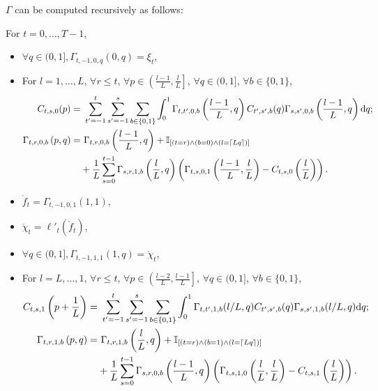 \documentclass{article}
\theoremstyle{plain}
\theoremstyle{definition}
\begin{document}
\begin{lemma}\label{lemma:finite_depth_gamma_formal}
$\Gamma$ can be computed recursively as follows:

For $t=0, \ldots, T-1$,
\begin{itemize}
    \item $\forall q\in (0, 1], \Gamma_{t,-1,0,q}(0,q)  = \xi_t$,
    \item For $l=1,\ldots,L$, 
    $\forall r \leq t$, 
    $\forall p \in \left(\frac{l-1}L,\frac lL\right]$,
    $\forall q\in (0,1]$, $\forall b\in \{0, 1\}$,
    \begin{align*} 
     C_{t,s,0}(p)=&~\sum_{t'=-1}^{t}\sum_{s'=-1}^{s}\sum_{b\in\{0,1\}}\int_0^1 \Gamma_{t,t',0,b}\left(\frac{l-1}L,q\right) C_{t',s',b}(q)\Gamma_{s,s',0,b}\left(\frac{l-1}L,q\right) \mathrm{d} q;\\
     \Gamma_{t,r,0,b}\left(p, q\right) = &~\Gamma_{t,r,0,b}\left(\frac{l-1}L, q\right) + \mathbb{I}_{[(t=r) \wedge (b=0) \wedge (l=\lceil L q\rceil)]} \\
     & + \frac1L \sum_{s=0}^{t-1} \Gamma_{s,r,1,b}\left(\frac l L, q\right)\left(\Gamma_{t,s,0,1}\left(\frac{l-1}L, \frac l L\right)-C_{t,s,0}\left(\frac l L\right)\right).
    \end{align*}
    \item $\mathring f_t = \Gamma_{t,-1,0,1}(1, 1)$,
    \item $\mathring \chi_t = \ell'_t(\mathring f_t)$,
    \item $\forall q\in (0, 1], \Gamma_{t, -1, 1, 1}(1, q)=\mathring \chi_t$,
    \item For $l=L,\ldots,1$, 
    $\forall r \leq t$, 
    $\forall p \in \left(\frac{l-2}L,\frac{l-1} L\right]$,
    $\forall q\in (0,1]$, $\forall b\in \{0, 1\}$,
    \begin{align*}
        C_{t,s,1}\left(p+\frac1L\right)=&~\sum_{t'=-1}^{t}\sum_{s'=-1}^{s}\sum_{b\in\{0,1\}}\int_0^1 \Gamma_{t,t',1,b}(l/L,q) C_{t',s',b}(q)\Gamma_{s,s',1,b}(l/L,q) \mathrm{d} q;\\
     \Gamma_{t,r,1,b}\left(p, q\right) = &~\Gamma_{t,r,1,b}\left(\frac{l}L, q\right) + \mathbb{I}_{[(t=r) \wedge (b=1) \wedge (l=\lceil L q\rceil)]} \\
     & + \frac1L \sum_{s=0}^{t-1} \Gamma_{s,r,0,b}\left(\frac {l-1} L, q\right)\left(\Gamma_{t,s,1,0}\left(\frac{l}L, \frac l L\right)-C_{t,s,1}\left(\frac l L\right)\right).\\
     \end{align*}
\end{itemize}
\end{lemma}
\end{document}

